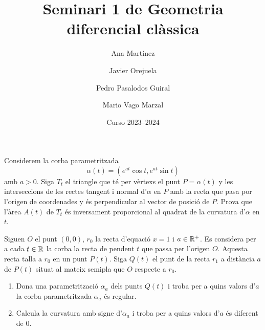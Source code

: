 \documentclass[a4paper, 11pt]{article}
\title{Seminari 1 de Geometria diferencial clàssica}
\author{Ana Martínez \and Javier Orejuela \and%
  Pedro Pasalodos Guiral \and Mario Vago Marzal}
\date{Curso 2023--2024}
\begin{document}
  \maketitle

  \begin{exercise}
    Considerem la corba parametritzada
    \[
      \alpha(t) = (e^{at} \cos t, e^{at} \sin t)
    \]
    amb $a > 0$. Siga $T_t$ el triangle que té per vèrtexs el punt $P =
    \alpha(t)$ y les interseccions de les rectes tangent i normal
    d'$\alpha$ en $P$ amb la recta que pasa por l'origen de coordenades y
    és perpendicular al vector de posició de $P$. Prova que l'àrea $A(t)$
    de $T_t$ és inversament proporcional al quadrat de la curvatura
    d'$\alpha$ en $t$.
  \end{exercise}

  \begin{solution}
    
  \end{solution}

  \begin{exercise}
    Siguen $O$ el punt $(0, 0)$, $r_0$ la recta d'equació $x=1$ i $a \in
    \mathbb{R}^+$. Es considera per a cada $t \in \mathbb{R}$ la corba la recta de
    pendent $t$ que passa per l'origen $O$. Aquesta recta talla a $r_0$ en
    un punt $P(t)$. Siga $Q(t)$ el punt de la recta $r_1$ a distància $a$
    de $P(t)$ situat al mateix semipla que $O$ respecte a $r_0$.

    \begin{enumerate}[label=(\alph*)]
      \item Dona una parametrització $\alpha_a$ dels punts $Q(t)$ i troba
      per a quins valors d'$a$ la corba parametritzada $\alpha_a$ és
      regular.
      \item Calcula la curvatura amb signe d'$\alpha_a$ i troba per a quins
      valors d'$a$ és diferent de $0$.
    \end{enumerate}
  \end{exercise}

  \begin{solution}
    
  \end{solution}
\end{document}
